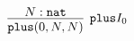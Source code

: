 \documentclass[crop]{standalone} %
\begin{document}
$\displaystyle
\infer[\texttt{plus} I_0]{
    \texttt{plus}(0, N, N)
}{
    N : \texttt{nat}
}
$
\end{document}
